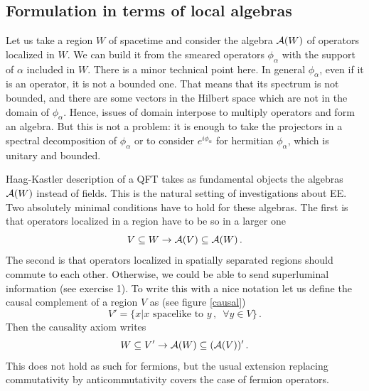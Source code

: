 \documentclass[12pt]{article}
\numberwithin{equation}{section}
\newcommand{\be}{\begin{equation}}
\newcommand{\ee}{\end{equation}}
\begin{document}
\subsection{Formulation in terms of local algebras}
Let us take a region $W$ of spacetime and consider the algebra ${\cal A}(W)$ of operators localized in $W$. We can build it from the smeared operators $\phi_\alpha$ with the support of $\alpha$ included in $W$. There is a minor technical point here. In general $\phi_\alpha$, even if it is an operator, it is not a bounded one. That means that its spectrum is not bounded, and there are some vectors in the Hilbert space which are not in the domain of $\phi_\alpha$. Hence, issues of domain interpose to multiply operators and form an algebra. But this is not a problem: it is enough to take the projectors in a spectral decomposition of $\phi_\alpha$ or to consider $e^{i \phi_\alpha}$ for hermitian $\phi_\alpha$, which is unitary and bounded. 

 

Haag-Kastler description of a QFT takes as fundamental objects the algebras ${\cal A}(W)$ instead of fields. This is the natural setting of investigations about EE. Two absolutely minimal conditions have to hold for these algebras. The first is that operators localized in a region have to be so in a larger one   
\be
V\subseteq W\rightarrow  {\cal A}(V) \subseteq {\cal A}(W)\,.
\ee
The second is that operators localized in spatially separated regions should commute to each other. Otherwise, we could be able to send superluminal information (see exercise 1). To write this with a nice notation let us define the causal complement of a region $V$ as (see figure \ref{causal})
\be
V'=\{x | x \,\,\textrm{spacelike to }y\,, \,\,\, \forall y \in V\}\,.  
\ee
Then the causality axiom writes 
\be
W\subseteq V'\rightarrow {\cal A}(W)\subseteq ({\cal A}(V))'\,.
\ee
This does not hold as such for fermions, but the usual extension replacing commutativity by anticommutativity covers the case of fermion operators.  
\end{document}
